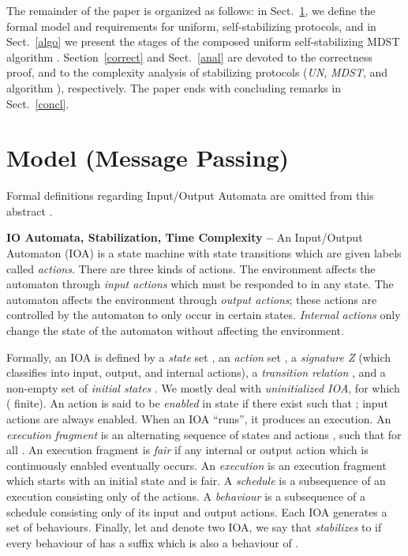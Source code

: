 \documentclass[10pt]{article}
\begin{document}
The remainder of the paper is organized as follows: in
Sect.~\ref{model}, we define the formal model  and
requirements for uniform, self-stabilizing protocols, and in
Sect.~\ref{algo} we present the stages of the composed uniform
self-stabilizing MDST algorithm . Section~\ref{correct} and
Sect.~\ref{anal} are devoted to the correctness proof, and to the
complexity analysis of stabilizing protocols ({\em UN}, {\em MDST},
and algorithm ), respectively. The paper ends with concluding
remarks in Sect.~\ref{concl}.

\section{Model  (Message Passing)}\label{model}
Formal definitions regarding Input/Output Automata are omitted from this
abstract \cite{APVD94,Varg94}.

{\bf IO Automata, Stabilization, Time Complexity --}
An Input/Output Automaton (IOA) is a state machine with state transitions
which are given labels called {\em actions}. There are three kinds of actions.
The environment affects the automaton through {\em input actions} which
must be responded to in any state. The automaton affects the environment
through {\em output actions}; these actions are controlled by the automaton
to only occur in certain states. {\em Internal actions} only change the
state of the automaton without affecting the environment.

Formally, an IOA is defined by a {\em state} set , an {\em action} set
, a {\em signature Z} (which classifies  into input, output, and
internal actions), a {\em transition relation} , and a non-empty set of {\em initial states} . We mostly
deal with {\em uninitialized IOA}, for which  ( finite). An action
 is said to be {\em enabled} in state  if there exist  such
that ; input actions are always enabled.
When an IOA ``runs'', it produces an execution. An {\em execution fragment}
is an alternating sequence of states and actions ,
such that  for all . An execution fragment
is {\em fair} if any internal or output action which is continuously
enabled eventually occurs. An {\em execution} is an execution fragment
which starts with an initial state and is fair. A {\em schedule} is a
subsequence of an execution consisting only of the actions. A {\em
behaviour} is a subsequence of a schedule consisting only of its input
and output actions. Each IOA generates a set of behaviours. Finally, let
 and  denote two IOA, we say that  {\em stabilizes} to  if
every behaviour of  has a suffix which is also a behaviour of .
\end{document}
